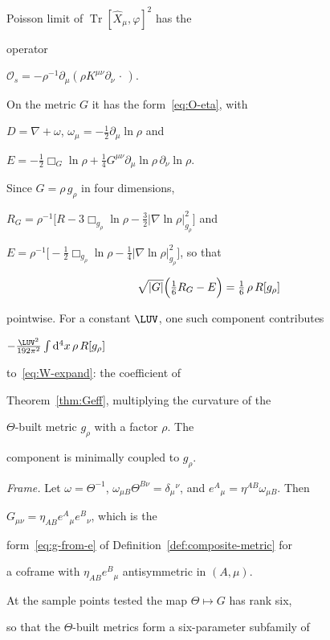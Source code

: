 Poisson limit of \(\operatorname{Tr}[\hat X_\mu,\varphi]^2\) has the

operator

\(\mathcal O_s=-\rho^{-1}\partial_\mu(\rho K^{\mu\nu}\partial_\nu\,\cdot\,)\).

On the metric \(G\) it has the form~\eqref{eq:O-eta}, with

\(D=\nabla+\omega\), \(\omega_\mu=-\tfrac12\partial_\mu\ln\rho\) and

\(E=-\tfrac12\Box_G\ln\rho

+\tfrac14G^{\mu\nu}\partial_\mu\ln\rho\,\partial_\nu\ln\rho\).

Since \(G=\rho\,g_\rho\) in four dimensions,

\(R_G=\rho^{-1}\bigl[R-3\Box_{g_\rho}\ln\rho

-\tfrac32|\nabla\ln\rho|^2_{g_\rho}\bigr]\) and

\(E=\rho^{-1}\bigl[-\tfrac12\Box_{g_\rho}\ln\rho

-\tfrac14|\nabla\ln\rho|^2_{g_\rho}\bigr]\), so that

\[

  \sqrt{|G|}\Bigl(\tfrac16R_G-E\Bigr)=\tfrac16\,\rho\,R[g_\rho]

\]

pointwise. For a constant \(\LUV\), one such component contributes

\(-\tfrac{\LUV^2}{192\pi^2}\int\mathrm{d}^4x\,\rho\,R[g_\rho]\)

to~\eqref{eq:W-expand}: the coefficient of

Theorem~\ref{thm:Geff}, multiplying the curvature of the

\(\Theta\)-built metric \(g_\rho\) with a factor \(\rho\). The

component is minimally coupled to \(g_\rho\).



\emph{Frame.} Let \(\omega=\Theta^{-1}\), \(\omega_{\mu B}\Theta^{B\nu}

=\delta_\mu{}^\nu\), and \(e^A{}_\mu=\eta^{AB}\omega_{\mu B}\). Then

\(G_{\mu\nu}=\eta_{AB}e^A{}_\mu e^B{}_\nu\), which is the

form~\eqref{eq:g-from-e} of Definition~\ref{def:composite-metric} for

a coframe with \(\eta_{AB}e^B{}_\mu\) antisymmetric in \((A,\mu)\).

At the sample points tested the map \(\Theta\mapsto G\) has rank six,

so that the \(\Theta\)-built metrics form a six-parameter subfamily of

